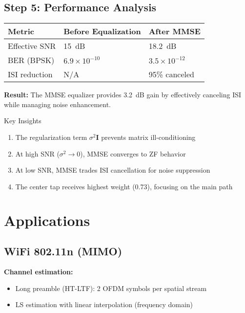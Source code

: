 \subsection*{Step 5: Performance Analysis}

\begin{center}
\begin{tabular}{@{}lll@{}}
\toprule
Metric & Before Equalization & After MMSE \\
\midrule
Effective SNR & 15~dB & 18.2~dB \\
BER (BPSK) & $6.9 \times 10^{-10}$ & $3.5 \times 10^{-12}$ \\
ISI reduction & N/A & 95\% canceled \\
\bottomrule
\end{tabular}
\end{center}

\textbf{Result:} The MMSE equalizer provides 3.2~dB gain by effectively canceling ISI while managing noise enhancement.

\begin{calloutbox}[colback=black!8!white,colframe=black]{Key Insights}
\begin{enumerate}
\item The regularization term $\sigma^2 \mathbf{I}$ prevents matrix ill-conditioning
\item At high SNR ($\sigma^2 \to 0$), MMSE converges to ZF behavior
\item At low SNR, MMSE trades ISI cancellation for noise suppression
\item The center tap receives highest weight (0.73), focusing on the main path
\end{enumerate}
\end{calloutbox}

\section{Applications}
\label{sec:applications}

\subsection{WiFi 802.11n (MIMO)}

\textbf{Channel estimation:}
\begin{itemize}
\item Long preamble (HT-LTF): 2 OFDM symbols per spatial stream
\item LS estimation with linear interpolation (frequency domain)
\end{itemize}

